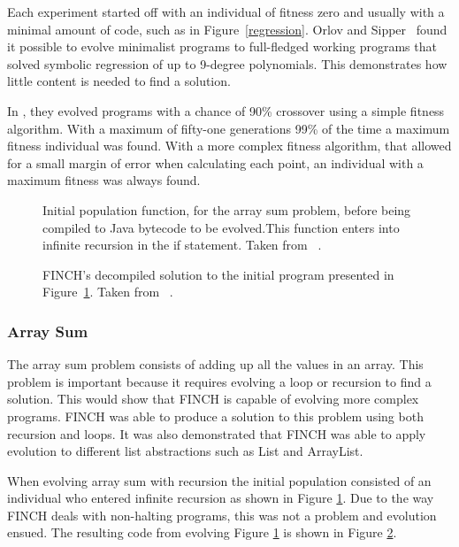 \documentclass{sig-alternate}
\begin{document}
Each experiment started off with an individual of fitness zero and usually with a minimal amount of code, such as in Figure~\ref{regression}. Orlov and Sipper~\cite{FINCH:2011} found it possible  to evolve minimalist programs to full-fledged working programs that solved symbolic regression of up to 9-degree polynomials. This demonstrates how little content is needed to find a solution.\par

In \cite{FINCH:2011}, they evolved programs with a chance of 90\% crossover using a simple fitness algorithm. With a maximum of fifty-one generations 99\% of the time a maximum fitness individual was found. With a more complex fitness algorithm, that allowed for a small margin of error when calculating each point, an individual with a maximum fitness was always found. 

\begin{figure}
\centering
{}
\caption{Initial population function, for the array sum problem, before being compiled to Java bytecode to be evolved.This function enters into infinite recursion in the if statement. Taken from ~\cite{FINCH:2011}.}
\label{initial rec}
\end{figure}

\begin{figure}
\centering
{}
\caption{FINCH's decompiled solution to the initial program presented in Figure~\ref{initial rec}. Taken from ~\cite{FINCH:2011}.}
\label{final rec}
\end{figure}

\subsubsection{Array Sum}
The array sum problem consists of adding up all the values in an array. This problem is important because it requires evolving a loop or recursion to find a solution. This would show that FINCH is capable of evolving more complex programs. FINCH was able to produce a solution to this problem using both recursion and loops. It was also demonstrated that FINCH was able to apply evolution to different list abstractions such as List and ArrayList.

When evolving array sum with recursion the initial population consisted of an individual who entered infinite recursion as shown in Figure \ref{initial rec}. Due to the way FINCH deals with non-halting programs, this was not a problem and evolution ensued. The resulting code from evolving Figure \ref{initial rec} is shown in Figure \ref{final rec}.
\end{document}
